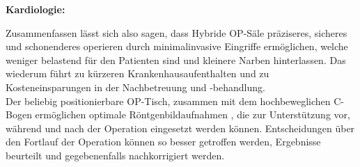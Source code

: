 \textbf{Kardiologie:} %


Zusammenfassen lässt sich also sagen, dass Hybride OP-Säle präziseres, sicheres und schonenderes operieren \cite{DresdnerUniklinikum} durch minimalinvasive Eingriffe ermöglichen, welche weniger belastend für den Patienten sind und kleinere Narben hinterlassen. Das wiederum  führt zu kürzeren Krankenhausaufenthalten und zu Kosteneinsparungen in der Nachbetreuung und -behandlung. \\
Der beliebig positionierbare OP-Tisch, zusammen mit dem hochbeweglichen C-Bogen  ermöglichen optimale Röntgenbildaufnahmen \cite{DresdnerUniklinikum}, die zur Unterstützung vor, während und nach der Operation eingesetzt werden können. Entscheidungen über den Fortlauf der Operation können so besser getroffen werden, Ergebnisse beurteilt und gegebenenfalls nachkorrigiert werden.

%
%


